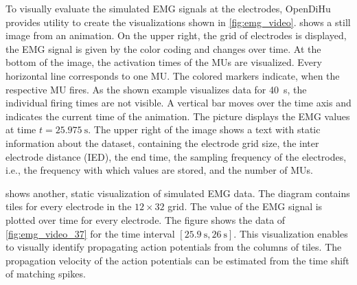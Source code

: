 To visually evaluate the simulated EMG signals at the electrodes, OpenDiHu provides utility to create the visualizations shown in \cref{fig:emg_video}.  shows a still image from an animation. On the upper right, the grid of electrodes is displayed, the EMG signal is given by the color coding and changes over time. At the bottom of the image, the activation times of the MUs are visualized. Every horizontal line corresponds to one MU. The colored markers indicate, when the respective MU fires. As the shown example visualizes data for \SI{40}{\s}, the individual firing times are not visible. A vertical bar moves over the time axis and indicates the current time of the animation. The picture displays the EMG values at time $t=\SI{25.975}{\s}$. The upper right of the image shows a text with static information about the dataset, containing the electrode grid size, the inter electrode distance (IED), the end time, the sampling frequency of the electrodes, i.e., the frequency with which values are stored, and the number of MUs.

 shows another, static visualization of simulated EMG data. The diagram contains tiles for every electrode in the $12\times 32$ grid. The value of the EMG signal is plotted over time for every electrode. The figure shows the data of \cref{fig:emg_video_37} for the time interval $[\SI{25.9}{\s},\SI{26}{\s}]$.
This visualization enables to visually identify propagating action potentials from the columns of tiles. The propagation velocity of the action potentials can be estimated from the time shift of matching spikes.

